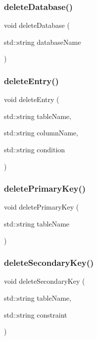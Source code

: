 \mbox{\label{sqllib_8hpp_a1d1fac4a7c1506f81908532050a8e58f}} 
\subsubsection{delete\+Database()}
{\footnotesize\ttfamily void delete\+Database (\begin{DoxyParamCaption}\item[{std\+::string}]{database\+Name }\end{DoxyParamCaption})}

\mbox{\label{sqllib_8hpp_a1ea4c59c6377c754fd0264b58f476685}} 
\subsubsection{delete\+Entry()}
{\footnotesize\ttfamily void delete\+Entry (\begin{DoxyParamCaption}\item[{std\+::string}]{table\+Name,  }\item[{std\+::string}]{column\+Name,  }\item[{std\+::string}]{condition }\end{DoxyParamCaption})}

\mbox{\label{sqllib_8hpp_a36d0f9bb1b86a8155d7551fcd014b4da}} 
\subsubsection{delete\+Primary\+Key()}
{\footnotesize\ttfamily void delete\+Primary\+Key (\begin{DoxyParamCaption}\item[{std\+::string}]{table\+Name }\end{DoxyParamCaption})}

\mbox{\label{sqllib_8hpp_aee892818f06208ce4b68fb7598a7494c}} 
\subsubsection{delete\+Secondary\+Key()}
{\footnotesize\ttfamily void delete\+Secondary\+Key (\begin{DoxyParamCaption}\item[{std\+::string}]{table\+Name,  }\item[{std\+::string}]{constraint }\end{DoxyParamCaption})}

